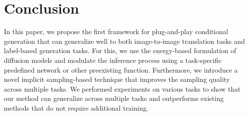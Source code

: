 \documentclass[10pt,twocolumn,letterpaper]{article}
\begin{document}
\section{Conclusion}
In this paper, we propose the first framework for plug-and-play conditional generation that can generalize well to both image-to-image translation tasks and label-based generation tasks. For this, we use the energy-based formulation of diffusion models and modulate the inference process using a task-specific predefined network or other preexisting function. Furthermore, we introduce a novel implicit sampling-based technique that improves the sampling quality across multiple tasks. We performed experiments on various tasks to show that our method can generalize across multiple tasks and outperforms existing methods that do not require additional training.
{\small


}
\clearpage
\end{document}
